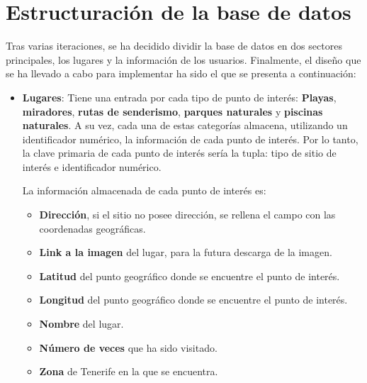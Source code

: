 \section{Estructuración de la base de datos}

Tras varias iteraciones, se ha decidido dividir la base de datos en dos sectores principales, los lugares y la información de los usuarios. Finalmente, el diseño que se ha llevado a cabo para implementar ha sido el que se presenta a continuación:

\begin{itemize}
\item \textbf{Lugares}: Tiene una entrada por cada tipo de punto de interés: \textbf{Playas}, \textbf{miradores}, \textbf{rutas de senderismo}, \textbf{parques naturales} y \textbf{piscinas naturales}. A su vez, cada una de estas categorías almacena, utilizando un identificador numérico, la información de cada punto de interés. Por lo tanto, la clave primaria de cada punto de interés sería la tupla: tipo de sitio de interés e identificador numérico.

La información almacenada de cada punto de interés es:
\begin{itemize}
    \item \textbf{Dirección}, si el sitio no posee dirección, se rellena el campo con las coordenadas geográficas.
    \item \textbf{Link a la imagen} del lugar, para la futura descarga de la imagen.
    \item \textbf{Latitud} del punto geográfico donde se encuentre el punto de interés.
    \item \textbf{Longitud} del punto geográfico donde se encuentre el punto de interés.
    \item \textbf{Nombre} del lugar.
    \item \textbf{Número de veces} que ha sido visitado.
    \item \textbf{Zona} de Tenerife en la que se encuentra.
\end{itemize}


\end{itemize}
